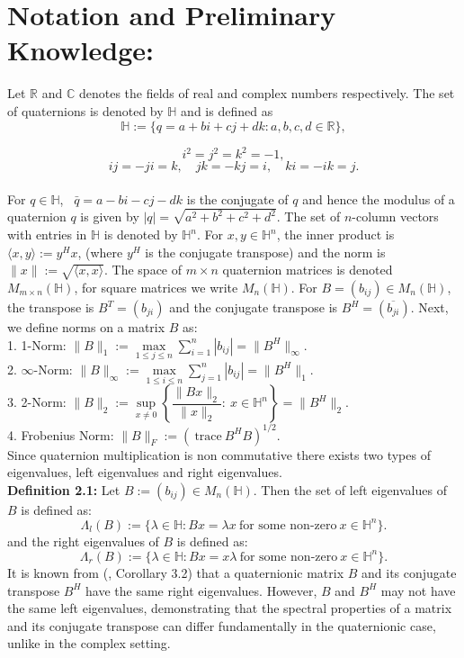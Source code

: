 \documentclass [12pt]{article}
\begin{document}
\section{Notation and Preliminary Knowledge:}  
Let $\mathbb{R}$ and $\mathbb{C}$ denotes the fields of  real and complex numbers  respectively. The set of quaternions is denoted by $\mathbb{H}$ and is defined as $$\mathbb{H}:=\{{q=a+bi+cj+dk:a, b, c, d \in\mathbb{R}} \},$$ 

\[
i^2 = j^2 = k^2 = -1,
\]
\[
ij = -ji = k, \quad jk = -kj = i, \quad ki = -ik = j.
\]\\
For $q \in\mathbb{H}$,~ ${\bar{q}}=a-bi-cj-dk$ is the conjugate of $q$ and hence the modulus of a quaternion $q$ is given by $|q|=\sqrt{a^{2}+b^{2}+c^{2}+d^{2}}.$ The set of \(n\)-column vectors with entries in \(\mathbb{H}\) is denoted by \(\mathbb{H}^n\). 
For \(x,y\in\mathbb{H}^n\), the inner product is \(\langle x,y\rangle := y^H x\), (where \(y^H\) is the conjugate transpose) and the norm is \(\|x\| := \sqrt{\langle x,x\rangle}\).  
The space of \(m\times n\) quaternion matrices is denoted \(M_{m\times n}(\mathbb{H})\), for square matrices we write \(M_n(\mathbb{H})\).  
For \(B=(b_{ij})\in M_n(\mathbb{H})\), the transpose is \(B^T=(b_{ji})\) and the conjugate transpose is \(B^H=(\overline{b_{ji}})\). Next, we define norms on a matrix $B$ as:\\
1. 1-Norm: $\|B\|_{1}:=\max\limits_{1\le j \le n}\sum\limits_{i=1}^{n}|b_{ij}|=\|B^{H}\|_{\infty}.$\\
2. $\infty$-Norm: $\|B\|_{\infty}:=\max\limits_{1\le i \le n}\sum\limits_{j=1}^{n}|b_{ij}|=\|B^{H}\|_{1}.$\\
3. 2-Norm: $\|B\|_{2}:=\sup\limits_{x\neq 0}\left\{ \dfrac{\|Bx\|_{2}}{\|x\|_{2}}:~x\in\mathbb{H}^{n}                         \right\}=\|B^{H}\|_{2}.$\\
4. Frobenius Norm: $\|B\|_{F}:={(~\mbox{trace}~   B^{H}B)}^{1/2}.$\\ 

\noindent Since quaternion multiplication is non commutative there exists two types of eigenvalues, left eigenvalues and right eigenvalues.\\

\noindent\textbf{Definition 2.1:} Let $B:=(b_{ij})\in M_{n}{(\mathbb{H})}$. Then the set of left eigenvalues of $B$ is defined as:\\
$$\Lambda_{l}(B):=\{ \lambda \in\mathbb{H} : Bx=\lambda x ~\mbox{for some non-zero} ~x\in\mathbb{H}^{n} \}.$$
and the right eigenvalues of $B$ is defined as:
$$\Lambda_{r}(B):=\{ \lambda \in\mathbb{H} : Bx=x \lambda  ~\mbox{for some non-zero}
~x\in\mathbb{H}^{n} \}.$$
It is known from (\cite{R1}, Corollary 3.2) that a quaternionic matrix $B$ and its conjugate transpose $B^{H}$ have the same right eigenvalues. However, $B$ and $B^{H}$  may not have the same left eigenvalues, demonstrating that the spectral properties of a matrix and its conjugate transpose can differ fundamentally in the quaternionic case, unlike in the complex setting.\\
\end{document}
